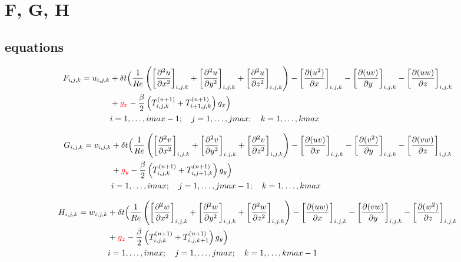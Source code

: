 \documentclass[10pt]{article}
\begin{document}
\section{F, G, H}

\subsection{equations}

\begin{equation}
\begin{split}
F_{i,j,k} =
u_{i,j,k} & + \delta t \Bigl(
\frac{1}{Re} \left( \left[\frac{\partial^2 u}{\partial x^2}\right]_{i,j,k} + \left[\frac{\partial^2 u}{\partial y^2}\right]_{i,j,k} + \left[\frac{\partial^2 u}{\partial z^2}\right]_{i,j,k} \right) - 
\left[\frac{\partial(u^2)}{\partial x}\right]_{i,j,k} -\left[\frac{\partial (uv)}{\partial y}\right]_{i,j,k} - 
\left[\frac{\partial (uw)}{\partial z}\right]_{i,j,k}\\
& + \textcolor{red}{g_x} - \frac{\beta}{2} \left( T^{(n+1)}_{i,j,k} + T^{(n+1)}_{i+1,j,k} \right) g_x \Bigr)\\
& i = 1,\ldots,imax-1; \quad j = 1,\ldots,jmax; \quad k = 1,\ldots,kmax
\end{split}
\end{equation}

\begin{equation}
\begin{split}
G_{i,j,k} = 
v_{i,j,k} & + \delta t \Bigl(
\frac{1}{Re} \left( \left[\frac{\partial^2 v}{\partial x^2}\right]_{i,j,k} + \left[\frac{\partial^2 v}{\partial y^2}\right]_{i,j,k} + \left[\frac{\partial^2 v}{\partial z^2}\right]_{i,j,k} \right) - 
\left[\frac{\partial(uv)}{\partial x}\right]_{i,j,k} -\left[\frac{\partial (v^2)}{\partial y}\right]_{i,j,k} - 
\left[\frac{\partial (vw)}{\partial z}\right]_{i,j,k}\\
& + \textcolor{red}{g_y} - \frac{\beta}{2} \left( T^{(n+1)}_{i,j,k} + T^{(n+1)}_{i,j+1,k} \right) g_y \Bigr)\\
& i = 1,\ldots,imax; \quad j = 1,\ldots,jmax-1; \quad k = 1,\ldots,kmax
\end{split}
\end{equation}

\begin{equation}
\begin{split}
H_{i,j,k} = 
w_{i,j,k} & + \delta t \Bigl(
\frac{1}{Re} \left( \left[\frac{\partial^2 w}{\partial x^2}\right]_{i,j,k} + \left[\frac{\partial^2 w}{\partial y^2}\right]_{i,j,k} + \left[\frac{\partial^2 w}{\partial z^2}\right]_{i,j,k} \right) - 
\left[\frac{\partial(uw)}{\partial x}\right]_{i,j,k} -\left[\frac{\partial (vw)}{\partial y}\right]_{i,j,k} - 
\left[\frac{\partial (w^2)}{\partial z}\right]_{i,j,k}\\
& + \textcolor{red}{g_z} - \frac{\beta}{2} \left( T^{(n+1)}_{i,j,k} + T^{(n+1)}_{i,j,k+1} \right) g_y \Bigr)\\
& i = 1,\ldots,imax; \quad j = 1,\ldots,jmax; \quad k = 1,\ldots,kmax-1
\end{split}
\end{equation}
\end{document}
